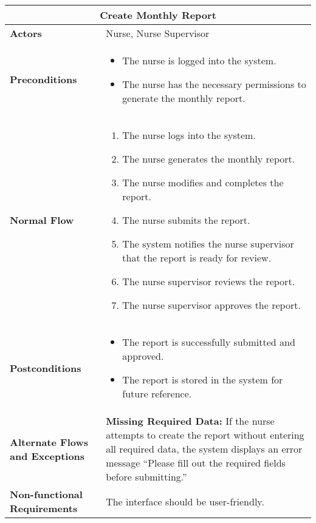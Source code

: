 \documentclass{article}
\begin{document}
\begin{longtable}{| p{5cm} | p{10cm} |}
    \hline
    \multicolumn{2}{|c|}{\textbf{Create Monthly Report}} \\
    \hline
    \textbf{Actors} & Nurse, Nurse Supervisor \\
    \hline
    \textbf{Preconditions} & 
    \begin{itemize}
        \item The nurse is logged into the system.
        \item The nurse has the necessary permissions to generate the monthly report.
    \end{itemize} \\
    \hline
    \textbf{Normal Flow} & 
    \begin{enumerate}
        \item The nurse logs into the system.
        \item The nurse generates the monthly report.
        \item The nurse modifies and completes the report.
        \item The nurse submits the report.
        \item The system notifies the nurse supervisor that the report is ready for review.
        \item The nurse supervisor reviews the report.
        \item The nurse supervisor approves the report.
    \end{enumerate} \\
    \hline
    \textbf{Postconditions} & 
    \begin{itemize}
        \item The report is successfully submitted and approved.
        \item The report is stored in the system for future reference.
    \end{itemize} \\
    \hline
    \textbf{Alternate Flows and Exceptions} & 
    \textbf{Missing Required Data:} If the nurse attempts to create the report without entering all required data, the system displays an error message “Please fill out the required fields before submitting.” \\
    \hline
    \textbf{Non-functional Requirements} & The interface should be user-friendly. \\
    \hline
\end{longtable}
\end{document}

